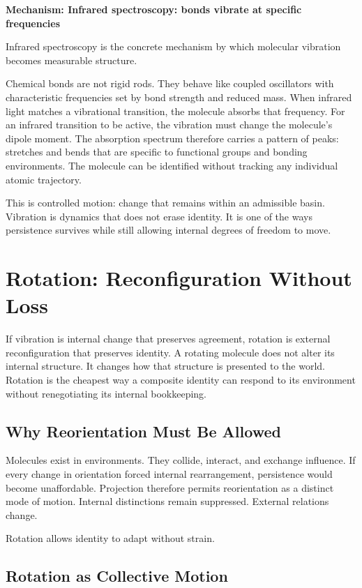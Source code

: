\documentclass[11pt,twoside,openright]{book}
\newenvironment{mechanismboxpage}[1]
  {\par\medskip
   \noindent
   \begin{minipage}{\linewidth}
   \begin{framed}
   \noindent\textbf{Mechanism: #1}\par\medskip}
  {\end{framed}
   \end{minipage}
   \par\medskip}
\begin{document}
\begin{mechanismboxpage}{Infrared spectroscopy: bonds vibrate at specific frequencies}
Infrared spectroscopy is the concrete mechanism by which molecular vibration becomes measurable structure.

Chemical bonds are not rigid rods. They behave like coupled oscillators with characteristic frequencies set by bond strength and reduced mass. When infrared light matches a vibrational transition, the molecule absorbs that frequency. For an infrared transition to be active, the vibration must change the molecule's dipole moment. The absorption spectrum therefore carries a pattern of peaks: stretches and bends that are specific to functional groups and bonding environments. The molecule can be identified without tracking any individual atomic trajectory.

This is controlled motion: change that remains within an admissible basin.
Vibration is dynamics that does not erase identity.
It is one of the ways persistence survives while still allowing internal degrees of freedom to move.
\end{mechanismboxpage}
\chapter{Rotation: Reconfiguration Without Loss}

If vibration is internal change that preserves agreement, rotation is external reconfiguration that preserves identity. A rotating molecule does not alter its internal structure. It changes how that structure is presented to the world. Rotation is the cheapest way a composite identity can respond to its environment without renegotiating its internal bookkeeping.

\section*{Why Reorientation Must Be Allowed}

Molecules exist in environments. They collide, interact, and exchange influence. If every change in orientation forced internal rearrangement, persistence would become unaffordable. Projection therefore permits reorientation as a distinct mode of motion. Internal distinctions remain suppressed. External relations change.

Rotation allows identity to adapt without strain.

\section*{Rotation as Collective Motion}
\end{document}

